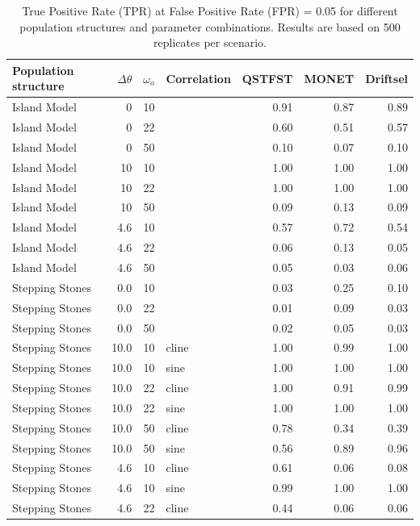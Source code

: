 \begin{table}[ht]
\centering
\caption{True Positive Rate (TPR) at False Positive Rate (FPR) = 0.05 for different population structures and parameter combinations. Results are based on 500 replicates per scenario.} 
\label{tab:tpr_fpr005}
\begin{tabular}{lrrlrrr}
  \toprule
Population structure & $\Delta\theta$ & $\omega_o$ & Correlation & QSTFST & MONET & Driftsel \\ 
  \midrule
Island Model & 0 & 10 &  & 0.91 & 0.87 & 0.89 \\ 
  Island Model & 0 & 22 &  & 0.60 & 0.51 & 0.57 \\ 
  Island Model & 0 & 50 &  & 0.10 & 0.07 & 0.10 \\ 
  Island Model & 10 & 10 &  & 1.00 & 1.00 & 1.00 \\ 
  Island Model & 10 & 22 &  & 1.00 & 1.00 & 1.00 \\ 
  Island Model & 10 & 50 &  & 0.09 & 0.13 & 0.09 \\ 
  Island Model & 4.6 & 10 &  & 0.57 & 0.72 & 0.54 \\ 
  Island Model & 4.6 & 22 &  & 0.06 & 0.13 & 0.05 \\ 
  Island Model & 4.6 & 50 &  & 0.05 & 0.03 & 0.06 \\ 
  Stepping Stones & 0.0 & 10 &  & 0.03 & 0.25 & 0.10 \\ 
  Stepping Stones & 0.0 & 22 &  & 0.01 & 0.09 & 0.03 \\ 
  Stepping Stones & 0.0 & 50 &  & 0.02 & 0.05 & 0.03 \\ 
  Stepping Stones & 10.0 & 10 & cline & 1.00 & 0.99 & 1.00 \\ 
  Stepping Stones & 10.0 & 10 & sine & 1.00 & 1.00 & 1.00 \\ 
  Stepping Stones & 10.0 & 22 & cline & 1.00 & 0.91 & 0.99 \\ 
  Stepping Stones & 10.0 & 22 & sine & 1.00 & 1.00 & 1.00 \\ 
  Stepping Stones & 10.0 & 50 & cline & 0.78 & 0.34 & 0.39 \\ 
  Stepping Stones & 10.0 & 50 & sine & 0.56 & 0.89 & 0.96 \\ 
  Stepping Stones & 4.6 & 10 & cline & 0.61 & 0.06 & 0.08 \\ 
  Stepping Stones & 4.6 & 10 & sine & 0.99 & 1.00 & 1.00 \\ 
  Stepping Stones & 4.6 & 22 & cline & 0.44 & 0.06 & 0.06 \\ 

\end{tabular}
\end{table}
